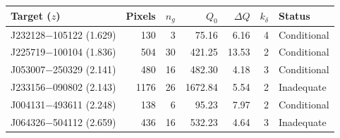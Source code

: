 \begingroup
\setlength{\tabcolsep}{4pt}
\begin{tabular}{lrrrrrl}
\toprule
Target ($z$) & Pixels & $n_g$ & $Q_0$ & $\Delta Q$ & $k_\delta$ & Status \\
\midrule
J232128$-$105122 (1.629) & 130 & 3 & 75.16 & 6.16 & 4 & Conditional \\
J225719$-$100104 (1.836) & 504 & 30 & 421.25 & 13.53 & 2 & Conditional \\
J053007$-$250329 (2.141) & 480 & 16 & 482.30 & 4.18 & 3 & Conditional \\
J233156$-$090802 (2.143) & 1176 & 26 & 1672.84 & 5.54 & 2 & Inadequate \\
J004131$-$493611 (2.248) & 138 & 6 & 95.23 & 7.97 & 2 & Conditional \\
J064326$-$504112 (2.659) & 436 & 16 & 532.23 & 4.64 & 3 & Inadequate \\
\bottomrule
\end{tabular}
\endgroup
